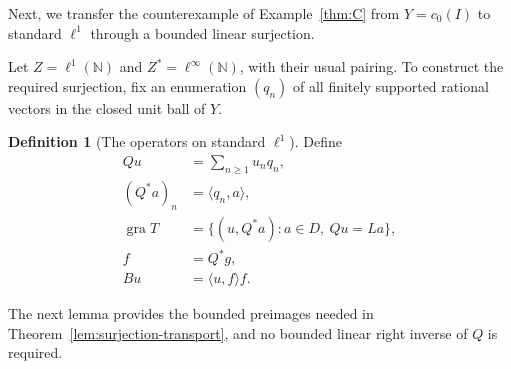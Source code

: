 \documentclass[11pt]{article}
\newcommand{\N}{\mathbb N}
\newcommand{\gra}{\operatorname{gra}}
\newcommand{\pair}[2]{\langle #1,#2\rangle}
\theoremstyle{definition}
\newtheorem{definition}{Definition}
\theoremstyle{remark}
\begin{document}
Next, we transfer the counterexample of Example~\ref{thm:C} from $Y=c_0(I)$ to standard $\ell^1$ through a bounded linear surjection.


Let $Z=\ell^1(\N)$ and $Z^*=\ell^\infty(\N)$, with their usual pairing. To construct the required surjection, fix an enumeration $(q_n)$ of all finitely supported rational vectors in the closed unit ball of $Y$.
\begin{definition}[The operators on standard $\ell^1$]
Define
\begin{equation}
\begin{aligned}
Qu&=\sum_{n\ge1}u_nq_n,\\
(Q^*a)_n&=\pair{q_n}{a},\\
\gra T&=\{(u,Q^*a):a\in D,\ Qu=La\},\\
f&=Q^*g,\\
Bu&=\pair{u}{f}f.
\end{aligned}
\label{eq:D10}
\end{equation}
\end{definition}
The next lemma provides the bounded preimages needed in Theorem~\ref{lem:surjection-transport}, and no bounded linear right inverse of $Q$ is required.
\end{document}
